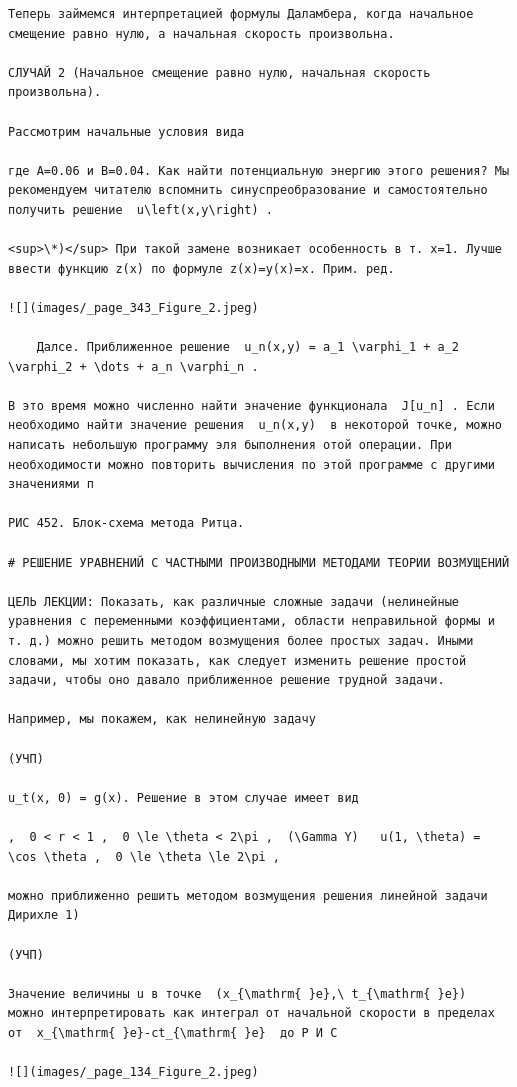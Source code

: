 \documentclass[
  ukrainian,
]{article}
\begin{document}
\begin{verbatim}
Теперь займемся интерпретацией формулы Даламбера, когда начальное смещение равно нулю, а начальная скорость произвольна.

СЛУЧАЙ 2 (Начальное смещение равно нулю, начальная скорость произвольна).

Рассмотрим начальные условия вида

где A=0.06 и B=0.04. Как найти потенциальную энергию этого решения? Мы рекомендуем читателю вспомнить синуспреобразование и самостоятельно получить решение  u\left(x,y\right) .

<sup>\*)</sup> При такой замене возникает особенность в т. x=1. Лучше ввести функцию z(x) по формуле z(x)=y(x)=x. Прим. ред.

![](images/_page_343_Figure_2.jpeg)

    Далсе. Приближенное решение  u_n(x,y) = a_1 \varphi_1 + a_2 \varphi_2 + \dots + a_n \varphi_n .

В это время можно численно найти эначение функционала  J[u_n] . Если необходимо найти значение решения  u_n(x,y)  в некоторой точке, можно написать небольшую программу эля быполнения отой операции. При необходимости можно повторить вычисления по этой программе с другими значениями п

РИС 452. Блок-схема метода Ритца.

# РЕШЕНИЕ УРАВНЕНИЙ С ЧАСТНЫМИ ПРОИЗВОДНЫМИ МЕТОДАМИ ТЕОРИИ ВОЗМУЩЕНИЙ

ЦЕЛЬ ЛЕКЦИИ: Показать, как различные сложные задачи (нелинейные уравнения с переменными коэффициентами, области неправильной формы и т. д.) можно решить методом возмущения более простых задач. Иными словами, мы хотим показать, как следует изменить решение простой задачи, чтобы оно давало приближенное решение трудной задачи.

Например, мы покажем, как нелинейную задачу

(УЧП)

u_t(x, 0) = g(x). Решение в этом случае имеет вид

,  0 < r < 1 ,  0 \le \theta < 2\pi ,  (\Gamma Y)   u(1, \theta) = \cos \theta ,  0 \le \theta \le 2\pi ,

можно приближенно решить методом возмущения решения линейной задачи Дирихле 1)

(УЧП)

Значение величины u в точке  (x_{\mathrm{ }e},\ t_{\mathrm{ }e})  можно интерпретировать как интеграл от начальной скорости в пределах от  x_{\mathrm{ }e}-ct_{\mathrm{ }e}  до Р И С

![](images/_page_134_Figure_2.jpeg)


\end{verbatim}
\end{document}

